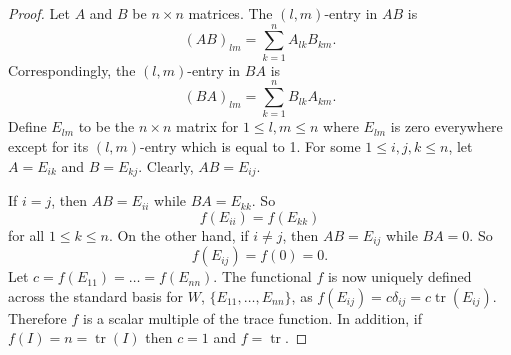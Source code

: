 \documentclass{article}
\DeclareMathOperator{\tr}{tr}
\begin{document}
\begin{proof}
  Let $A$ and $B$ be $n \times n$ matrices. The $(l, m)$-entry in $AB$ is \[
    (AB)_{lm} = \sum_{k=1}^n A_{lk}B_{km}.
  \] Correspondingly, the $(l, m)$-entry in $BA$ is \[
    (BA)_{lm} = \sum_{k=1}^n B_{lk}A_{km}.
  \] Define $E_{lm}$ to be the $n \times n$ matrix for $1 \leq l, m \leq n$
  where $E_{lm}$ is zero everywhere except for its $(l, m)$-entry which is equal
  to 1. For some $1 \leq i, j, k \leq n$, let $A = E_{ik}$ and $B = E_{kj}$.
  Clearly, $AB = E_{ij}$.

  If $i = j$, then $AB = E_{ii}$ while $BA = E_{kk}$. So \[
    f(E_{ii}) = f(E_{kk})
  \] for all $1 \leq k \leq n$. On the other hand, if $i \neq j$, then $AB =
  E_{ij}$ while $BA = 0$. So \[
    f(E_{ij}) = f(0) = 0.
  \] Let $c = f(E_{11}) = \ldots = f(E_{nn})$. The functional $f$ is now
  uniquely defined across the standard basis for $W$, $\{E_{11}, \ldots,
  E_{nn}\}$, as $f(E_{ij}) = c\delta_{ij} = c\tr(E_{ij})$. Therefore $f$ is a
  scalar multiple of the trace function. In addition, if $f(I) = n = \tr(I)$
  then $c = 1$ and $f = \tr$.
\end{proof}
\end{document}
